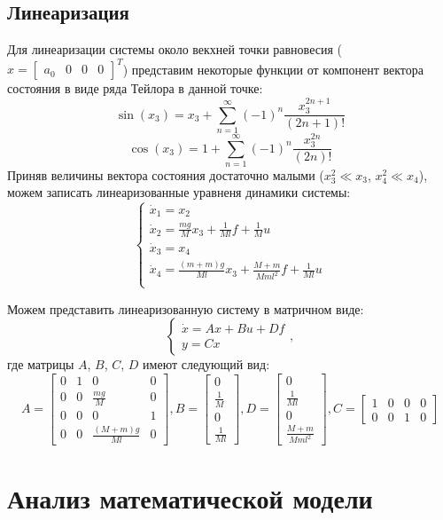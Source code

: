 \subsection{Линеаризация}
Для линеаризации системы около векхней точки равновесия ($x = \begin{bmatrix}
    a_0 & 0 & 0 & 0
\end{bmatrix}^T$) представим некоторые функции от компонент вектора состояния в виде ряда Тейлора в данной точке:
\begin{equation*}\sin(x_3) = x_3 + \sum_{n=1}^{\infty}(-1)^n\frac{x_3^{2n+1}}{(2n+1)!}\end{equation*}
\begin{equation*}\cos(x_3) = 1 + \sum_{n=1}^{\infty}(-1)^n\frac{x_3^{2n}}{(2n)!}\end{equation*}
Приняв величины вектора состояния достаточно малыми ($x_3^2 \ll x_3$, $x_4^2 \ll x_4$), можем записать линеаризованные уравненя динамики системы:
\begin{equation} \label{eq:10}
    \begin{cases}
        \dot x_1 = x_2 \\
        \dot x_2 = \frac{mg}{M}x_3 + \frac{1}{Ml}f + \frac{1}{M}u \\
        \dot x_3 = x_4 \\
        \dot x_4 = \frac{(m+m)g}{Ml}x_3 + \frac{M+m}{Mml^2}f + \frac{1}{Ml}u \\
    \end{cases}
\end{equation}

Можем представить линеаризованную систему в матричном виде:
\begin{equation} \label{eq:11}
    \begin{cases}
        \dot x = Ax + Bu + Df \\
        y = Cx
    \end{cases},
\end{equation}
где матрицы $A$, $B$, $C$, $D$ имеют следующий вид:
\begin{equation}
    A = \begin{bmatrix}
        0 & 1 & 0 & 0 \\
        0 & 0 & \frac{mg}{M} & 0 \\
        0 & 0 & 0 & 1 \\
        0 & 0 & \frac{(M+m)g}{Ml} & 0
    \end{bmatrix},
    B = \begin{bmatrix}
        0 \\ \frac{1}{M} \\ 0 \\ \frac{1}{Ml}
    \end{bmatrix},
    D = \begin{bmatrix}
        0 \\ \frac{1}{Ml} \\ 0 \\ \frac{M+m}{Mml^2}
    \end{bmatrix},
    C = \begin{bmatrix}
        1 & 0 & 0 & 0 \\
        0 & 0 & 1 & 0
    \end{bmatrix}
\end{equation}
\pagebreak

\section{Анализ математической модели}